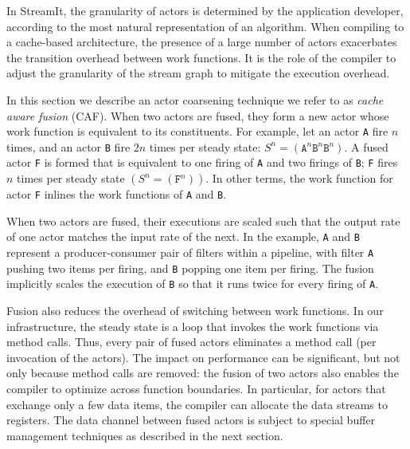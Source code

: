 In StreamIt, the granularity of actors is determined by the
application developer, according to 
the most natural representation of an algorithm. When compiling to a
cache-based architecture, the presence of a  large number of actors
exacerbates the transition overhead between work functions.
It is the role of the compiler  to adjust the granularity of
the stream graph to mitigate the execution overhead.

In this section we describe an actor coarsening technique we refer to
as {\it cache aware fusion} (CAF). When two actors are fused, they
form a new actor whose work function is equivalent to its constituents.
For example, let an actor \texttt{A} fire $n$
times, and an actor \texttt{B} fire $2n$ times per steady state:
$S^n=(\texttt{A}^n\texttt{B}^n\texttt{B}^n)$. A fused actor \texttt{F}
is formed that is equivalent to one firing of \texttt{A} and two 
firings of \texttt{B}; \texttt{F} fires $n$ times per steady state
$(S^n=(\texttt{F}^n))$.  In other terms, the work
function for actor \texttt{F} inlines the work functions of
\texttt{A} and \texttt{B}.

When two actors are fused, their executions are scaled such that the output
rate of one actor matches the input rate of the next. In the example,
\texttt{A} and \texttt{B} represent a producer-consumer pair of
filters within a pipeline, with filter \texttt{A}  
pushing two items per firing, and \texttt{B} popping one item per
firing. The fusion implicitly scales the execution of \texttt{B} so
that it runs twice for every firing of \texttt{A}.


Fusion also reduces the overhead of switching between
work functions. In our infrastructure, the steady state is a loop that
invokes the work functions via method calls. Thus, every pair of fused
actors eliminates a method call (per invocation of the actors). The impact on
performance can be significant, but not only because method calls are
removed: the fusion of two actors also enables the compiler to
optimize across function boundaries. In particular, for actors that
exchange only a few data items, the compiler can allocate the data
streams to registers. 
The data channel between fused actors is
subject to special buffer management techniques as described in the
next section.

